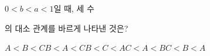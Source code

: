$0<b<a<1$일 때, 세 수 \par\smallskip{}\par\smallskip\noindent 의 대소 관계를 바르게 나타낸 것은?
\begin{choices32}{$A<B<C$}{$B<A<C$}{$B<C<A$}{$C<A<B$}{$C<B<A$}\end{choices32}
